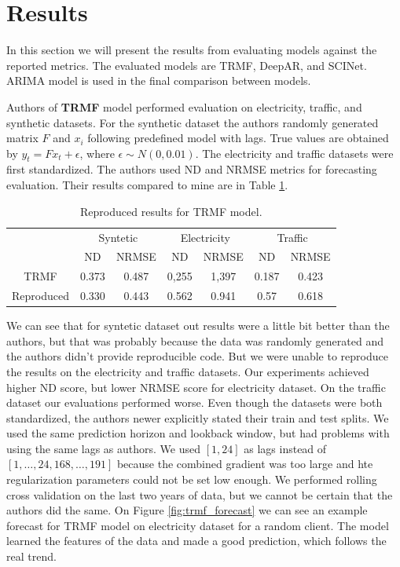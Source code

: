 \documentclass[conference]{IEEEtran}
\begin{document}
\section{Results}
\label{chap:results}

In this section we will present the results from evaluating models against the reported metrics.
The evaluated models are TRMF, DeepAR, and SCINet.
ARIMA model is used in the final comparison between models.

Authors of \textbf{TRMF} model performed evaluation on electricity, traffic, and synthetic datasets.
For the synthetic dataset the authors randomly generated matrix $F$ and $x_{i}$ following predefined model with lags.
True values are obtained by $y_{t} = Fx_{t}+\epsilon$, where $\epsilon \sim N(0, 0.01)$.
The electricity and traffic datasets were first standardized.
The authors used ND and NRMSE metrics for forecasting evaluation.
Their results compared to mine are in Table \ref{tab:trmf_exp}.

\begin{table}[htb]
    \centering
    \begin{tabular}{c|cc|cc|cc}
         & \multicolumn{2}{c}{Syntetic} & \multicolumn{2}{c}{Electricity} & \multicolumn{2}{c}{Traffic} \\
         & ND & NRMSE & ND & NRMSE & ND & NRMSE \\
        \hline
        TRMF & 0.373 & 0.487 & 0,255 & 1,397 & 0.187 & 0.423 \\
        Reproduced & 0.330 & 0.443 & 0.562 & 0.941 & 0.57 & 0.618 \\
    \end{tabular}
    \caption{Reproduced results for TRMF model.}
    \label{tab:trmf_exp}
\end{table}

We can see that for syntetic dataset out results were a little bit better than the authors, but that was probably because the data was randomly generated and the authors didn't provide reproducible code.
But we were unable to reproduce the results on the electricity and traffic datasets.
Our experiments achieved higher ND score, but lower NRMSE score for electricity dataset.
On the traffic dataset our evaluations performed worse. Even though the datasets were both standardized, the authors newer explicitly stated their train and test splits.
We used the same prediction horizon and lookback window, but had problems with using the same lags as authors.
We used $[1, 24]$ as lags instead of $[1, \dots, 24, 168, \dots, 191]$ because the combined gradient was too large and hte regularization parameters could not be set low enough.
We performed rolling cross validation on the last two years of data, but we cannot be certain that the authors did the same.
On Figure \ref{fig:trmf_forecast} we can see an example forecast for TRMF model on electricity dataset for a random client.
The model learned the features of the data and made a good prediction, which follows the real trend.
\end{document}
